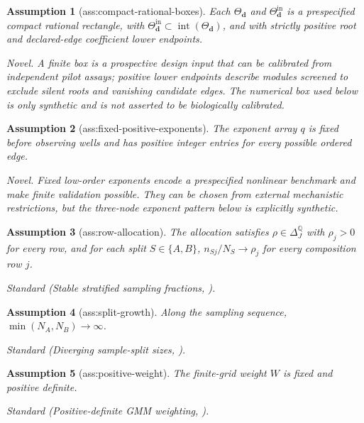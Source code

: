 \documentclass{article}
\newtheorem{assumption}{Assumption}
\begin{document}
\begin{assumption}[ass:compact-rational-boxes]\label{ass:compact-rational-boxes}
Each \(\Theta_{\boldsymbol d}\) and \(\Theta^{\mathrm{in}}_{\boldsymbol d}\) is a prespecified compact rational rectangle, with \(\Theta^{\mathrm{in}}_{\boldsymbol d}\subset\operatorname{int}(\Theta_{\boldsymbol d})\), and with strictly positive root and declared-edge coefficient lower endpoints.
\par\smallskip\noindent\emph{Novel.} A finite box is a prospective design input that can be calibrated from independent pilot assays; positive lower endpoints describe modules screened to exclude silent roots and vanishing candidate edges. The numerical box used below is only synthetic and is not asserted to be biologically calibrated.
\end{assumption}

\begin{assumption}[ass:fixed-positive-exponents]\label{ass:fixed-positive-exponents}
The exponent array \(q\) is fixed before observing wells and has positive integer entries for every possible ordered edge.
\par\smallskip\noindent\emph{Novel.} Fixed low-order exponents encode a prespecified nonlinear benchmark and make finite validation possible. They can be chosen from external mechanistic restrictions, but the three-node exponent pattern below is explicitly synthetic.
\end{assumption}

\begin{assumption}[ass:row-allocation]\label{ass:row-allocation}
The allocation satisfies \(\rho\in\Delta_J^{\mathbb Q}\) with \(\rho_j>0\) for every row, and for each split \(S\in\{A,B\}\), \(n_{Sj}/N_S\to\rho_j\) for every composition row \(j\).
\par\smallskip\noindent\emph{Standard} (Stable stratified sampling fractions, \cite{CarrascoFlorens2000ContinuumGMM}).
\end{assumption}

\begin{assumption}[ass:split-growth]\label{ass:split-growth}
Along the sampling sequence, \(\min(N_A,N_B)\to\infty\).
\par\smallskip\noindent\emph{Standard} (Diverging sample-split sizes, \cite{NeweyMcFadden1994LargeSample}).
\end{assumption}

\begin{assumption}[ass:positive-weight]\label{ass:positive-weight}
The finite-grid weight \(W\) is fixed and positive definite.
\par\smallskip\noindent\emph{Standard} (Positive-definite GMM weighting, \cite{CarrascoFlorens2000ContinuumGMM}).
\end{assumption}
\end{document}
